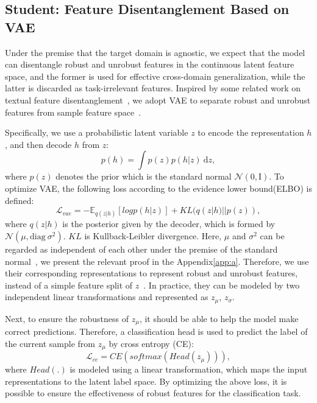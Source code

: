 \documentclass[letterpaper]{article} %
\begin{document}
\subsection{Student: Feature Disentanglement Based on VAE}
Under the premise that the target domain is agnostic, we expect that the model can disentangle robust and unrobust features in the continuous latent feature space, and the former is used for effective cross-domain generalization, while the latter is discarded as task-irrelevant features. Inspired by some related work on textual feature disentanglement~\cite{BaoZHLMVDC19, JohnMBV19}, we adopt VAE to separate robust and unrobust features from sample feature space~\cite{KingmaW13}. 

Specifically, we use a probabilistic latent variable $z$ to encode the representation $h$, and then decode $h$ from $z$:
\begin{equation}
	p(h) = \int p(z)p(h|z)~\mathrm{d}z,
\end{equation}
where $p(z)$ denotes the prior which is the standard normal $\mathcal{N}(0, \mathrm{I})$. To optimize VAE, the following loss according to the evidence lower bound(ELBO) is defined:
\begin{equation}
	\mathcal{L}_{vae} = -\mathbb{E}_{q(z|h)}[logp(h|z)] + KL(q(z|h)||p(z)),
\end{equation}
where $q(z|h)$ is the posterior given by the decoder, which is formed by $\mathcal{N}(\mu, \mathrm{diag}~\sigma^2)$. $KL$ is Kullback-Leibler divergence. Here, $\mu$ and $\sigma^2$ can be regarded as independent of each other under the premise of the standard normal~\cite{kawata1949characterisation,Fotopoulos07}, we present the relevant proof in the Appendix\ref{app:a}. Therefore, we use their corresponding representations to represent robust and unrobust features, instead of a simple feature split of $z$~\cite{JohnMBV19}. In practice, they can be modeled by two independent linear transformations and represented as $z_{\mu}$, $z_{\sigma}$. 

Next, to ensure the robustness of $z_{\mu}$, it should be able to help the model make correct predictions. Therefore, a classification head is used to predict the label of the current sample from $z_{\mu}$ by cross entropy (CE):
\begin{equation}
	\mathcal{L}_{ce} = CE(softmax(Head(z_{\mu}))),
\end{equation}
where $Head(.)$ is modeled using a linear transformation, which maps the input representations to the latent label space. By optimizing the above loss, it is possible to ensure the effectiveness of robust features for the classification task.
\end{document}
